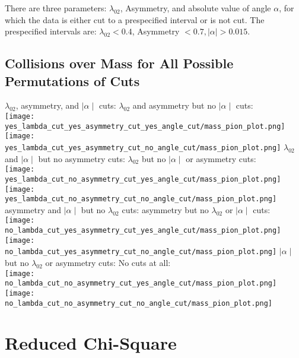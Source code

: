 \documentclass[11pt]{article}
\begin{document}
There are three parameters: $\lambda_{02}$, Asymmetry, and absolute value of angle $\alpha$, for which the data is either cut to a prespecified interval or is not cut. The prespecified intervals are: $\lambda_{02} < 0.4$, Asymmetry $< 0.7, \mid\alpha\mid > 0.015 $.
\subsection{Collisions over Mass for All Possible Permutations of Cuts} %
\begin{frame}{}
$\lambda_{02}$, asymmetry, and $\mid\alpha\mid$ cuts:
\noindent\hspace{1 cm}$\lambda_{02}$ and asymmetry but no $\mid\alpha\mid$ cuts:\\
\texttt{[image: yes\_lambda\_cut\_yes\_asymmetry\_cut\_yes\_angle\_cut/mass\_pion\_plot.png]}
\texttt{[image: yes\_lambda\_cut\_yes\_asymmetry\_cut\_no\_angle\_cut/mass\_pion\_plot.png]}
$\lambda_{02}$ and $\mid\alpha\mid$ but no asymmetry cuts:
\noindent\hspace{1 cm}$\lambda_{02}$ but no $\mid\alpha\mid$ or asymmetry cuts:\\
\texttt{[image: yes\_lambda\_cut\_no\_asymmetry\_cut\_yes\_angle\_cut/mass\_pion\_plot.png]}
\texttt{[image: yes\_lambda\_cut\_no\_asymmetry\_cut\_no\_angle\_cut/mass\_pion\_plot.png]}
asymmetry and $\mid\alpha\mid$ but no $\lambda_{02}$ cuts:
\noindent\hspace{1 cm}asymmetry but no $\lambda_{02}$ or $\mid\alpha\mid$ cuts:\\
\texttt{[image: no\_lambda\_cut\_yes\_asymmetry\_cut\_yes\_angle\_cut/mass\_pion\_plot.png]}
\texttt{[image: no\_lambda\_cut\_yes\_asymmetry\_cut\_no\_angle\_cut/mass\_pion\_plot.png]}
$\mid\alpha\mid$ but no $\lambda_{02}$ or asymmetry cuts:
\noindent\hspace{1 cm} No cuts at all:\\
\texttt{[image: no\_lambda\_cut\_no\_asymmetry\_cut\_yes\_angle\_cut/mass\_pion\_plot.png]}
\texttt{[image: no\_lambda\_cut\_no\_asymmetry\_cut\_no\_angle\_cut/mass\_pion\_plot.png]}
\end{frame}

\section{Reduced Chi-Square}
\end{document}
